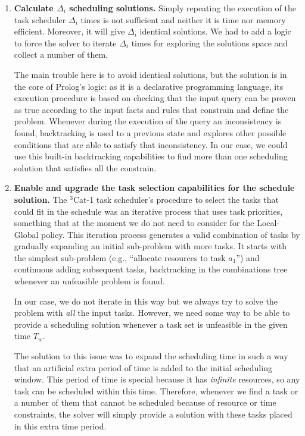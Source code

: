 \begin{enumerate}
\item \textbf{Calculate $\Delta_i$ scheduling solutions. } Simply repeating the execution of the task scheduler $\Delta_i$ times is not sufficient and neither it is time nor memory efficient. Moreover, it will give $\Delta_i$ identical solutions. We had to add a logic to force the solver to iterate $\Delta_i$ times for exploring the solutions space and collect a number of them.

The main trouble here is to avoid identical solutions, but the solution is in the core of Prolog's logic: as it is a declarative programming language, its execution procedure is based on checking that the input query can be proven as true according to the input facts and rules that constrain and define the problem. Whenever during the execution of the query an inconsistency is found, backtracking is used to a previous state and explores other possible conditions that are able to satisfy that inconsistency. In our case, we could use this built-in backtracking capabilities to find more than one scheduling solution that satisfies all the constrain.

\item \textbf{Enable and upgrade the task selection capabilities for the schedule solution. } The $^3$Cat-1 task scheduler's procedure to select the tasks that could fit in the schedule was an iterative process that uses task priorities, something that at the moment we do not need to consider for the Local-Global policy. This iteration process generates a valid combination of tasks by gradually expanding an initial sub-problem with more tasks. It starts with the simplest sub-problem (e.g., ``allocate resources to task $a_1$'') and continuous adding subsequent tasks, backtracking in the combinations tree whenever an unfeasible problem is found.

In our case, we do not iterate in this way but we always try to solve the problem with \emph{all} the input tasks. However, we need some way to be able to provide a scheduling solution whenever a task set is unfeasible in the given time $T_w$.

The solution to this issue was to expand the scheduling time in such a way that an artificial extra period of time is added to the initial scheduling window. This period of time is special because it has \emph{infinite} resources, so any task can be scheduled within this time. Therefore, whenever we find a task or a number of them that cannot be scheduled because of resource or time constraints, the solver will simply provide a solution with these tasks placed in this extra time period.


\end{enumerate}
